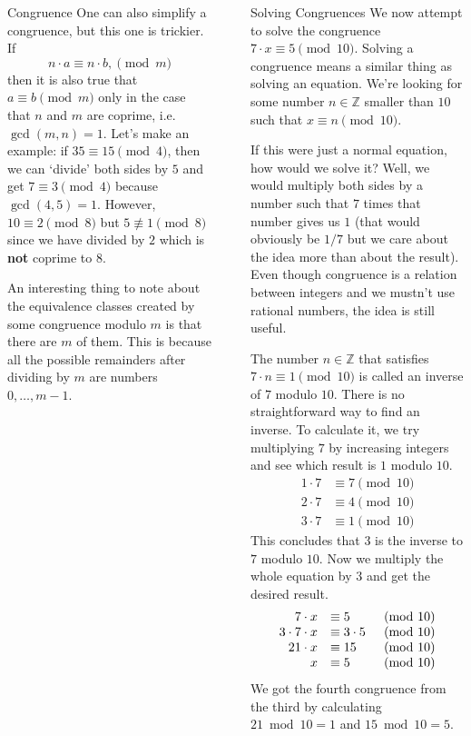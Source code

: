 \documentclass[final]{beamer}
\newlength{\sepwidth}
\newlength{\colwidth}
\newcommand{\separatorcolumn}{\begin{column}{\sepwidth}\end{column}}
\newcommand{\Z}{\mathbb{Z}}
\begin{document}
\begin{frame}[t]
\begin{columns}[t]
\begin{column}{\colwidth}
\begin{block}{Congruence}
 One can also \alert{simplify a congruence}, but this one is trickier. If
 \[
  n \cdot a \equiv n \cdot b, \pmod{m}
 \]
 then \alert{it is also true that} $a \equiv b \pmod{m}$ \alert{only in the case
 that} $n$ and $m$ \alert{are coprime}, i.e. $\gcd(m,n) = 1$. Let's make an
 example: if $35 \equiv 15 \pmod{4}$, then we can `divide' both sides by $5$ and
 get $7 \equiv 3 \pmod{4}$ because $\gcd(4,5) = 1$. However, $10 \equiv 2
 \pmod{8}$ but $5 \not\equiv 1 \pmod{8}$ since we have divided by $2$ which is
 \textbf{not} coprime to $8$.

 An interesting thing to note about the equivalence classes created by some
 congruence modulo $m$ is that there are $m$ of them. This is because all the
 possible remainders after dividing by $m$ are numbers $0, \ldots, m - 1$. 
\end{block}

\end{column}
\separatorcolumn
\begin{column}{\colwidth}
\begin{exampleblock}{Solving Congruences}
 We now attempt to \alert{solve the congruence} $7 \cdot x \equiv 5 \pmod{10}$.
 \alert{Solving a congruence} means a similar thing as \alert{solving an
 equation}. We're looking for some number $n \in \Z$ smaller than $10$ such that
 $x \equiv n \pmod{10}$.

 If this were just a normal equation, how would we solve it? Well, we would
 multiply both sides by a number such that $7$ times that number gives us $1$
 (that would obviously be $1 / 7$ but we care about the idea more than about the
 result). Even though \alert{congruence is a relation between integers} and
 \alert{we mustn't use rational numbers}, the idea is still useful.

The number $n \in \Z$ that satisfies $7 \cdot n \equiv 1 \pmod{10}$ is called an
\alert{inverse} of $7$ modulo $10$. There is no straightforward way to find
\alert{an inverse}. To calculate it, we try multiplying $7$ by increasing
integers and see which result is $1$ modulo $10$. 
\begin{equation*}
   \begin{split}
    1 \cdot 7 & \equiv 7 \pmod{10}\\
    2 \cdot 7 & \equiv 4 \pmod{10}\\
    3 \cdot 7 & \equiv 1 \pmod{10}
   \end{split}
  \end{equation*}
This concludes that $3$ is the \alert{inverse} to $7$ modulo $10$. Now \alert{we
multiply the whole equation by $3$} and get the desired result.
\[
 \begin{array}{r l r}
  7 \cdot x &\equiv 5 & \pmod{10}\\
  3 \cdot 7 \cdot x & \equiv 3 \cdot 5 & \pmod{10}\\
  21 \cdot x & \equiv 15 &\pmod{10}\\
  x & \equiv 5 &\pmod{10}
 \end{array}
\]
We got the fourth congruence from the third by calculating $21 \bmod 10 = 1$ and
$15 \bmod 10 = 5$.


\end{exampleblock}
\end{column}
\end{columns}
\end{frame}
\end{document}
